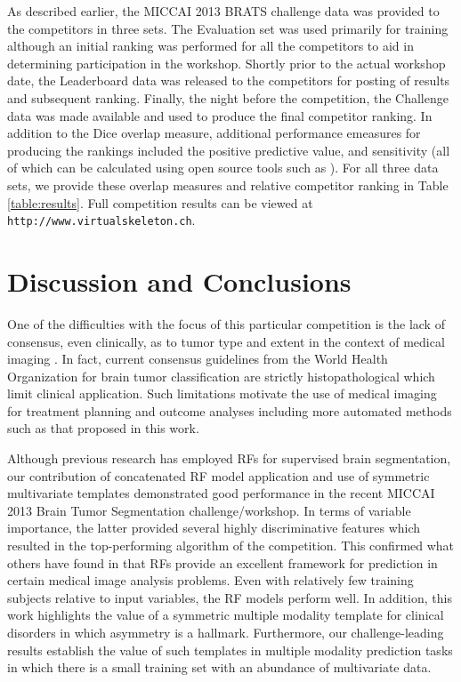 \documentclass[preprint,authoryear,review,12pt]{elsarticle}
\begin{document}
{As described earlier, the MICCAI 2013 BRATS challenge data was provided to the
competitors in three sets.  The Evaluation set was used primarily for training
although an initial ranking was performed for all the competitors to aid in
determining participation in the workshop.  Shortly prior to the actual workshop
date, the Leaderboard data was released to the competitors for posting of results
and subsequent ranking.  Finally, the night before the competition, the Challenge
data was made available and used to produce the final competitor ranking.  In addition
to the Dice overlap measure, additional performance emeasures for producing the rankings 
included the positive predictive value, and sensitivity (all of which can be calculated
using open source tools such as \cite{tustison2009}).  
For all three data sets, we provide these overlap measures and relative competitor 
ranking in Table \ref{table:results}.  Full competition results can be viewed
at {\tt http://www.virtualskeleton.ch}.

\section{Discussion and Conclusions} 

One of the difficulties with the focus of this particular competition 
is the lack of consensus, even clinically, as to tumor type and extent
in the context of medical imaging \citep{cha2005}.  In fact, current 
consensus guidelines from the World Health Organization for brain 
tumor classification are strictly histopathological \citep{louis2007}
which limit clinical application.  Such limitations motivate the
use of medical imaging for treatment planning and outcome analyses 
\citep{cha2005} including more automated methods such as that proposed
in this work.

Although previous research has employed RFs for supervised brain
segmentation, our contribution of concatenated RF model application and use
of symmetric multivariate templates demonstrated good performance 
in the recent MICCAI 2013 Brain Tumor Segmentation challenge/workshop.  
In terms of variable importance, the latter provided several highly 
discriminative features which resulted in the top-performing algorithm 
of the competition.  This confirmed what others have found in that
RFs provide an excellent framework for prediction in certain
medical image analysis problems.  Even with relatively few training
subjects relative to input variables, the RF models
perform well.
In addition, this work highlights the value of  a symmetric multiple
modality template for clinical disorders in which asymmetry is a
hallmark.  Furthermore, our challenge-leading results establish the
value of such templates in multiple modality prediction
tasks in which there is a small training set with an abundance of
multivariate data.

}
\end{document}
